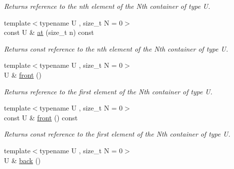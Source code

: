 \begin{DoxyCompactItemize}
\begin{DoxyCompactList}\small\item\em Returns reference to the nth element of the Nth container of type U. \end{DoxyCompactList}\item 
\hypertarget{classheterogeneous_1_1heterovector_3_01_t_00_01_types_8_8_8_4_af7ae098622d99fdac23d52aa0ae90ee8}{}{\footnotesize template$<$typename U , size\+\_\+t N = 0$>$ }\\const U \& \hyperlink{classheterogeneous_1_1heterovector_3_01_t_00_01_types_8_8_8_4_af7ae098622d99fdac23d52aa0ae90ee8}{at} (size\+\_\+t n) const \label{classheterogeneous_1_1heterovector_3_01_t_00_01_types_8_8_8_4_af7ae098622d99fdac23d52aa0ae90ee8}

\begin{DoxyCompactList}\small\item\em Returns const reference to the nth element of the Nth container of type U. \end{DoxyCompactList}\item 
\hypertarget{classheterogeneous_1_1heterovector_3_01_t_00_01_types_8_8_8_4_a112b4978960edab8dbb3e98b427505dc}{}{\footnotesize template$<$typename U , size\+\_\+t N = 0$>$ }\\U \& \hyperlink{classheterogeneous_1_1heterovector_3_01_t_00_01_types_8_8_8_4_a112b4978960edab8dbb3e98b427505dc}{front} ()\label{classheterogeneous_1_1heterovector_3_01_t_00_01_types_8_8_8_4_a112b4978960edab8dbb3e98b427505dc}

\begin{DoxyCompactList}\small\item\em Returns reference to the first element of the Nth container of type U. \end{DoxyCompactList}\item 
\hypertarget{classheterogeneous_1_1heterovector_3_01_t_00_01_types_8_8_8_4_a6bc78c3a332f808aa77d7fe11425d764}{}{\footnotesize template$<$typename U , size\+\_\+t N = 0$>$ }\\const U \& \hyperlink{classheterogeneous_1_1heterovector_3_01_t_00_01_types_8_8_8_4_a6bc78c3a332f808aa77d7fe11425d764}{front} () const \label{classheterogeneous_1_1heterovector_3_01_t_00_01_types_8_8_8_4_a6bc78c3a332f808aa77d7fe11425d764}

\begin{DoxyCompactList}\small\item\em Returns const reference to the first element of the Nth container of type U. \end{DoxyCompactList}\item 
\hypertarget{classheterogeneous_1_1heterovector_3_01_t_00_01_types_8_8_8_4_a8b88e5b9c42af3539bcda9ea0927ee89}{}{\footnotesize template$<$typename U , size\+\_\+t N = 0$>$ }\\U \& \hyperlink{classheterogeneous_1_1heterovector_3_01_t_00_01_types_8_8_8_4_a8b88e5b9c42af3539bcda9ea0927ee89}{back} ()\label{classheterogeneous_1_1heterovector_3_01_t_00_01_types_8_8_8_4_a8b88e5b9c42af3539bcda9ea0927ee89}


\end{DoxyCompactItemize}
